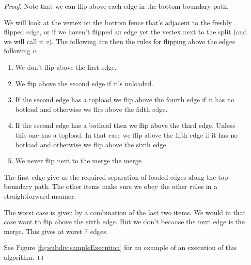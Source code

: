 \begin{proof}
  Note that we can flip above each edge in the bottom boundary path.

  We will look at the vertex on the bottom fence that's adjacent to the freshly flipped edge,  or if we haven't flipped an edge yet the vertex next to the split (and we will call it $v$). The following are then the rules for flipping above the edges following $v$.
  \begin{enumerate}
    \item We don't flip above the first edge.
    \item We flip above the second edge if it's unloaded.
    \item If the second edge has a topload we flip above the fourth edge if it has no botload and otherwise we flip above the fidth edge.
    \item If the second edge has a botload then we flip above the third edge. Unless this one has a topload. In that case we flip above the fifth edge if it has no botload and otherwise we flip above the sixth edge.
    \item We never flip next to the merge the merge
  \end{enumerate}

The first edge give us the required separation of loaded edges along the top boundary path. The other items make sure we obey the other rules in a straightforward manner.

The worst case is given by a combination of the last two items. We would in that case want to flip above the sixth edge. But we don't because the next edge is the merge. This gives at worst 7 edges.



See Figure \ref{fig:subdiv:sampleExecution} for an example of an execution of this algorithm.


\end{proof}
